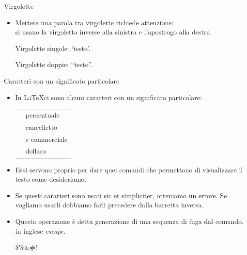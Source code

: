 \documentclass{beamer}
\begin{document}

\begin{frame}[fragile]{\centerline{Virgolette}}
\small
\begin{itemize}
\item Mettere una parola tra virgolette richiede attenzione:\\
si usano la virgoletta inverse \keystroke{\`{}} alla sinistra e l'apostrogo \keystroke{\'{}} alla destra.
\begin{exampletwouptiny}
Virgolette singole: `testo'.

Virgolette doppie: ``testo''.
\end{exampletwouptiny}

\end{itemize}
\end{frame}


\begin{frame}[fragile]{\centerline{Caratteri con un significato particolare}}
\small
\begin{itemize}

\item In \LaTeX ci sono  alcuni caratteri con un significato particolare:\\[1ex]
\begin{tabular}{cl}
\keystrokebftt{\%} & percentuale              \\
\keystrokebftt{\#} & cancelletto \\
\keystrokebftt{\&} & e commerciale                 \\
\keystrokebftt{\$} & dollaro               \\
\end{tabular}
\item Essi servono proprio per dare quei comandi che permettono di visualizzare il testo come desideriamo.
\item Se questi caratteri sono usati sic et simpliciter, otteniamo un errore. Se vogliamo usarli dobbiamo farli precedere dalla barretta inversa.
\item Questa operazione \`{e} detta generazione di una sequenza di fuga dal comando, in inglese \emph{escape}.
\begin{exampletwoup}
\$\%\&\#!
\end{exampletwoup}
\end{itemize}
\end{frame}
\end{document}

